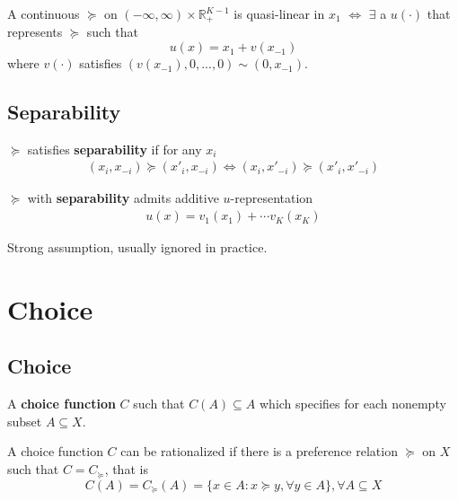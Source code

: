 \documentclass[11pt]{elegantbook}
\begin{document}
\begin{theorem}[Quasi-Linearity $\Leftrightarrow$ $u(x)=x_1+v(x_{-1})$]
    A continuous $\succeq$ on $(-\infty,\infty)\times \mathbb{R}_+^{K-1}$ is quasi-linear in $x_1$ $\Leftrightarrow$ $\exists$ a $u(\cdot)$ that represents $\succeq$ such that $$u(x)=x_1+v(x_{-1})$$
    where $v(\cdot)$ satisfies $(v(x_{-1}),0,...,0)\sim(0,x_{-1})$.
\end{theorem}

\subsection{Separability}
\begin{definition}[Separability]
    \normalfont
    $\succeq$ satisfies \textbf{separability} if for any $x_i$
    \begin{equation}
        \begin{aligned}
            (x_i, x_{-i})\succeq (x'_i, x_{-i}) \Leftrightarrow (x_i, x'_{-i})\succeq (x'_i, x'_{-i})
        \end{aligned}
        \nonumber
    \end{equation}
\end{definition}

\begin{theorem}
    $\succeq$ with \textbf{separability} admits additive $u$-representation
    \begin{equation}
        \begin{aligned}
            u(x)=v_1(x_1)+\cdots v_K(x_K)
        \end{aligned}
        \nonumber
    \end{equation}
\end{theorem}

\begin{note}
    Strong assumption, usually ignored in practice.
\end{note}










\section{Choice}
\subsection{Choice}
\begin{definition}
    \normalfont
    A \textbf{choice function} $C$ such that $C(A)\subseteq A$ which specifies for each nonempty subset $A\subseteq X$.
\end{definition}
A choice function $C$ can be rationalized if there is a preference relation $\succeq$ on $X$ such that $C=C_\succeq$, that is $$C(A)=C_\succeq(A)=\{x\in A:x\succeq y, \forall y\in A\}, \forall A\subseteq X$$
\end{document}
